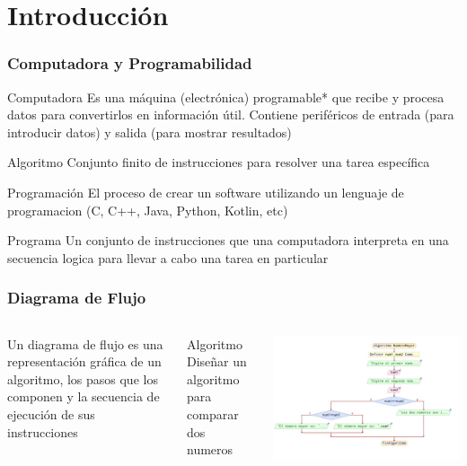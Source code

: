 
\section{Introducci\'on}

\begin{frame}
\frametitle{Computadora y Programabilidad}  
\begin{block}{Computadora}
Es una m\'aquina (electr\'onica) programable* que recibe y procesa datos para convertirlos en informaci\'on \'util. Contiene perif\'ericos de entrada (para introducir datos) y salida (para mostrar resultados) \pause
\end{block}
\begin{block}{Algoritmo}
Conjunto finito de instrucciones para resolver una tarea espec\'ifica \pause
\end{block}

\begin{block}{Programaci\'on}
El proceso de crear un software utilizando un lenguaje de programacion (C, C++, Java, Python, Kotlin, etc) \pause
\end{block}

\begin{block}{Programa}
Un conjunto de instrucciones que una computadora interpreta en una secuencia logica para llevar a cabo una tarea en particular \pause
\end{block}

\end{frame}

\begin{frame}
\frametitle{Diagrama de Flujo} 
\begin{columns}
Un diagrama de flujo es una representaci\'on gr\'afica de un algoritmo, los pasos que los componen y la secuencia de ejecuci\'on de sus instrucciones
\begin{block}{Algoritmo}
Dise\~nar un algoritmo para comparar dos numeros
\end{block}

\begin{center}
\includegraphics[width=0.95\linewidth]{00_IntroProgramacionYMoviles/DiagramaFlujo1.jpg} 
\end{center}
\end{columns}
\end{frame}

